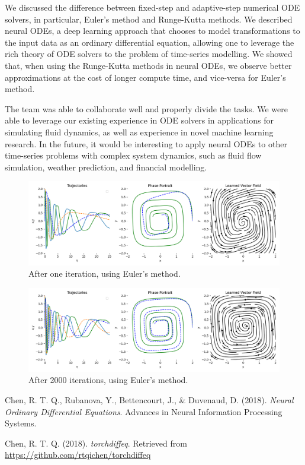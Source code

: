 \documentclass[11pt]{article}
\begin{document}
We discussed the difference between fixed-step and adaptive-step numerical ODE solvers, in particular, Euler's method and Runge-Kutta methods. We described neural ODEs, a deep learning approach that chooses to model transformations to the input data as an ordinary differential equation, allowing one to leverage the rich theory of ODE solvers to the problem of time-series modelling. We showed that, when using the Runge-Kutta methods in neural ODEs, we observe better approximations at the cost of longer compute time, and vice-versa for Euler's method.

The team was able to collaborate well and properly divide the tasks. We were able to leverage our existing experience in ODE solvers in applications for simulating fluid dynamics, as well as experience in novel machine learning research. In the future, it would be interesting to apply neural ODEs to other time-series problems with complex system dynamics, such as fluid flow simulation, weather prediction, and financial modelling.


\begin{figure}
  \centering
  \includegraphics*[width=\linewidth]{000_euler.png}
  \caption{After one iteration, using Euler's method.}
  \label{fig:first_iteration_euler}
\end{figure}

\begin{figure}
  \centering
  \includegraphics*[width=\linewidth]{099_euler.png}
  \caption{After 2000 iterations, using Euler's method.}
  \label{fig:last_iteration_euler}
\end{figure}

\begin{thebibliography}{9}

    Chen, R. T. Q., Rubanova, Y., Bettencourt, J., \& Duvenaud, D. (2018).
    \textit{Neural Ordinary Differential Equations}.
    Advances in Neural Information Processing Systems.
  
    Chen, R. T. Q. (2018).
    \textit{torchdiffeq}.
    Retrieved from \url{https://github.com/rtqichen/torchdiffeq}
  
\end{thebibliography}



  
\end{document}
